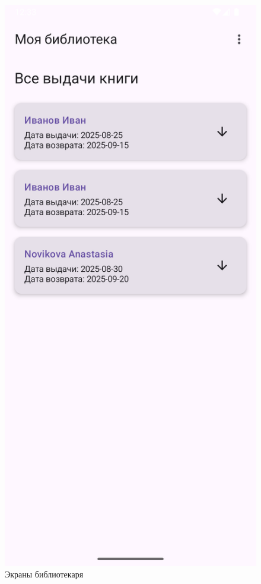 \begin{figure}[H]
	\includegraphics[scale=0.125]{img/issuance_list.png}
	\caption{Экраны библиотекаря}
\end{figure}

